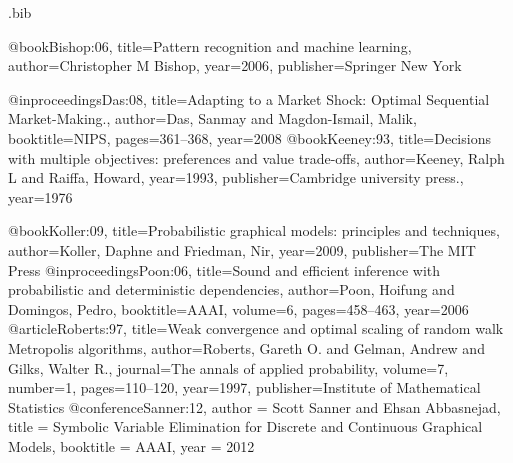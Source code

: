 \RequirePackage{filecontents}        %

\begin{filecontents*}{\jobname.bib}

@book{Bishop:06,
  title={Pattern recognition and machine learning},
  author={Christopher M Bishop},
  year={2006},
  publisher={Springer New York}
}

@inproceedings{Das:08,
  title={Adapting to a Market Shock: Optimal Sequential Market-Making.},
  author={Das, Sanmay and Magdon-Ismail, Malik},
  booktitle={NIPS},
  pages={361--368},
  year={2008}
}
@book{Keeney:93,
  title={Decisions with multiple objectives: preferences and value trade-offs},
  author={Keeney, Ralph L and Raiffa, Howard},
  year={1993},
  publisher={Cambridge university press.},
  year={1976}
}

@book{Koller:09,
  title={Probabilistic graphical models: principles and techniques},
  author={Koller, Daphne and Friedman, Nir},
  year={2009},
  publisher={The MIT Press}
}
@inproceedings{Poon:06,
  title={Sound and efficient inference with probabilistic and deterministic dependencies},
  author={Poon, Hoifung and Domingos, Pedro},
  booktitle={AAAI},
  volume={6},
  pages={458--463},
  year={2006}
}
@article{Roberts:97,
  title={Weak convergence and optimal scaling of random walk Metropolis algorithms},
  author={Roberts, Gareth O. and Gelman, Andrew and Gilks, Walter R.},
  journal={The annals of applied probability},
  volume={7},
  number={1},
  pages={110--120},
  year={1997},
  publisher={Institute of Mathematical Statistics}
}
@conference{Sanner:12,
author = {Scott Sanner and Ehsan Abbasnejad},
title = {Symbolic Variable Elimination for Discrete and Continuous Graphical Models},
booktitle = {AAAI},
year = {2012}
}

\end{filecontents*}

\documentclass{article} %
\usepackage{nips14submit_e,times}%
\usepackage{hyperref}
\usepackage{url}
\usepackage{amsthm} %
\usepackage{amsfonts} %
\usepackage{graphicx}
\usepackage{caption} %
\usepackage{subcaption} %
\usepackage{amsmath} %

